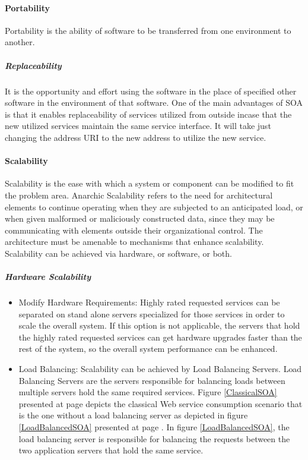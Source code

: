 \documentclass[12pt,a4paper,final,twoside,onecolumn,titlepage]{book}
\begin{document}
\paragraph{Portability}
Portability is the ability of software to be transferred from one environment to another.
\subparagraph{Replaceability}
It is the opportunity and effort using the software in the place of specified other software in the environment of that software. One of the main advantages of SOA is that it enables replaceability of services utilized from outside incase that the new utilized services maintain the same service interface. It will take just changing the address URI to the new address to utilize the new service.
\paragraph{Scalability}
Scalability is the ease with which a system or component can be modified to fit the problem area. Anarchic Scalability refers to the need for architectural elements to continue operating when they are subjected to an anticipated load, or when given malformed or maliciously constructed data, since they may be communicating with elements outside their organizational control. The architecture must be amenable to mechanisms that enhance scalability. Scalability can be achieved via hardware, or software, or both.
\subparagraph{Hardware Scalability}
\begin{itemize}
\item Modify Hardware Requirements: Highly rated requested services can be separated on stand alone servers specialized for those services in order to scale the overall system. If this option is not applicable, the servers that hold the highly rated requested services can get hardware upgrades faster than the rest of the system, so the overall system performance can be enhanced.
\item Load Balancing: Scalability can be achieved by Load Balancing Servers. Load Balancing Servers are the servers responsible for balancing loads between multiple servers hold the same required services. Figure \ref{ClassicalSOA} presented at page \pageref{ClassicalSOA} depicts the classical Web service consumption scenario that is the one without a load balancing server as depicted in figure \ref{LoadBalancedSOA} presented at page \pageref{LoadBalancedSOA}. In figure \ref{LoadBalancedSOA}, the load balancing server is responsible for balancing the requests between the two application servers that hold the same service.
\end{itemize}
 
\end{document}
